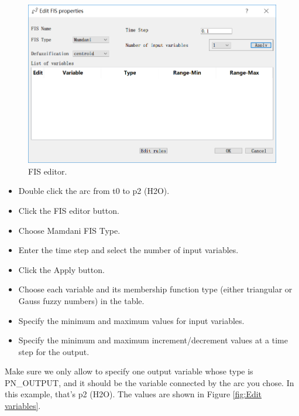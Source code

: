 \documentclass[journal,a4paper,onecolumn]{article}
\begin{document}
 \begin{figure}[!hbt]
 	\begin{center}
 		\includegraphics[width=\columnwidth]{fig7}
 		\caption{FIS editor.}
 		\label{fig:FIS editor}
 	\end{center}
 \end{figure}

\begin{itemize}
	\item Double click the arc from t0 to p2 (H2O).
	\item Click the FIS editor button.
	\item Choose Mamdani FIS Type.
	\item Enter the time step and select the number of input variables.
	\item Click the Apply button.
	\item Choose each variable and its membership function type (either triangular or Gauss fuzzy numbers) in the table.
	\item Specify the minimum and maximum values for input variables.
	\item Specify the minimum and maximum increment/decrement values at a time step for the output.
\end{itemize}

Make sure we only allow to specify one output variable whose type is PN\_OUTPUT, and it should be the variable connected by the arc you chose. In this example, that's p2 (H2O). The values are shown in Figure \ref{fig:Edit variables}.
\end{document}

